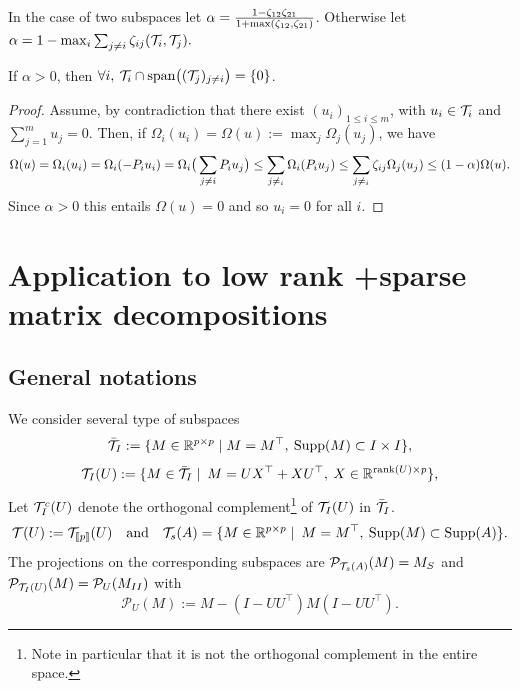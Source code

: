 \documentclass{article}
\begin{document}
\begin{lemma}
\label{lem:zero_inter}
In the case of two subspaces let $\alpha=\frac{1-\zeta_{12}\zeta_{21}}{1+\max(\zeta_{12},\zeta_{21})}$. Otherwise let $\alpha=1-\max_{i} \sum_{j\neq i} \zeta_{ij}(\mathcal{T}_i,\mathcal{T}_j).$

If $\alpha>0$, then $\forall i, \: \mathcal{T}_i \cap \text{span}\big ( (\mathcal{T}_j)_{j\neq i}\big) =\{0\}$.
\end{lemma}
\begin{proof}
Assume, by contradiction that there exist $(u_i)_{1\leq i\leq m}$, with $u_i \in \mathcal{T}_i$ and
$\sum_{j=1}^m u_j=0$. Then, if $\Omega_i(u_i)=\Omega(u):=\max_j \Omega_j(u_j)$, we have 
$$\Omega(u)=\Omega_i(u_i)=\Omega_i(-P_i u_i)=\Omega_i \big ( \sum_{j \neq i} P_i u_j \big ) \leq \sum_{j \neq _i} \Omega_i(P_i u_j) \leq \sum_{j \neq _i} \zeta_{ij} \Omega_j(u_j) \leq (1-\alpha) \Omega(u).$$ Since $\alpha>0$ this entails $\Omega(u)=0$ and so $u_i=0$ for all $i$. 
\end{proof}




\section{Application to low rank +sparse matrix decompositions}
\subsection{General notations}
We consider several type of subspaces
$$\bar{\mathcal{T}}_I:=\{M \in \mathbb{R}^{p \times p}\mid  M=M^\top, \: {\rm Supp}(M)\subset I \times I\},$$
$$\mathcal{T}_I(U):=\{M \in \bar{\mathcal{T}}_I\mid \: M=UX^\top+XU^\top,\: X \in \mathbb{R}^{\text{rank}(U) \times p} \},$$
Let $\mathcal{T}^c_I(U)$ denote the orthogonal complement\footnote{Note in particular that it is not the orthogonal complement in the entire space.} of $\mathcal{T}_I(U)$ in $\bar{\mathcal{T}}_I$. 
$$\mathcal{T}(U):=\mathcal{T}_{[\![p]\!]}(U)\quad \text{and} \quad \mathcal{T}_s(A)=\{M \in \mathbb{R}^{p \times p}\mid  \: M=M^\top, \: {\rm Supp}(M)\subset {\rm Supp}(A)\}.$$
The projections on the corresponding subspaces are $\mathcal{P}_{\mathcal{T}_s(A)}(M)=M_S$ and $\mathcal{P}_{\mathcal{T}_I(U)}(M)=\mathcal{P}_{U}(M_{II})$ with $$\mathcal{P}_U(M):=M-(I-UU^\top)M(I-UU^\top).$$
\end{document}
